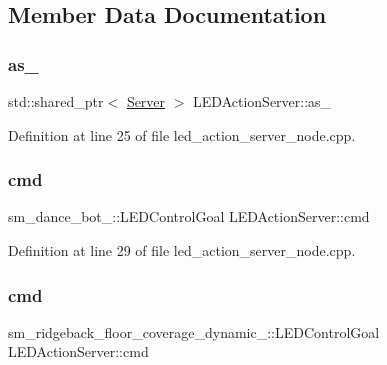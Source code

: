 \subsection{Member Data Documentation}
\mbox{\label{classLEDActionServer_a61d21c77642081acf017d4ebd65b2de0}} 
\subsubsection{\texorpdfstring{as\+\_\+}{as\_}}
{\footnotesize\ttfamily std\+::shared\+\_\+ptr$<$ \hyperlink{odom__tracker__node_8cpp_a9884574d0480319430f628f79afc0500}{Server} $>$ L\+E\+D\+Action\+Server\+::as\+\_\+}



Definition at line 25 of file led\+\_\+action\+\_\+server\+\_\+node.\+cpp.

\mbox{\label{classLEDActionServer_a754ac14e0c9bde99ae28feb59c0801c0}} 
\subsubsection{\texorpdfstring{cmd}{cmd}\hspace{0.1cm}{\footnotesize\ttfamily [1/5]}}
{\footnotesize\ttfamily sm\+\_\+dance\+\_\+bot\+\_\+::\+L\+E\+D\+Control\+Goal L\+E\+D\+Action\+Server\+::cmd}



Definition at line 29 of file led\+\_\+action\+\_\+server\+\_\+node.\+cpp.

\mbox{\label{classLEDActionServer_a38ceb1a2a5898788f4692e3b5fb393b2}} 
\subsubsection{\texorpdfstring{cmd}{cmd}\hspace{0.1cm}{\footnotesize\ttfamily [2/5]}}
{\footnotesize\ttfamily sm\+\_\+ridgeback\+\_\+floor\+\_\+coverage\+\_\+dynamic\+\_\+::\+L\+E\+D\+Control\+Goal L\+E\+D\+Action\+Server\+::cmd}



